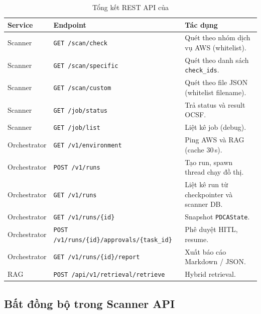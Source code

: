 \begin{table}[!htb]
  \centering
  \caption{Tổng kết REST API của \sysnameshort{}}
  \label{tab:api_summary}
  \renewcommand{\arraystretch}{1.15}
  \begin{tabular}{|l|l|p{6.5cm}|}
    \hline
    \textbf{Service} & \textbf{Endpoint} & \textbf{Tác dụng} \\ \hline
    Scanner          & \texttt{GET /scan/check}        & Quét theo nhóm dịch vụ AWS (whitelist). \\ \hline
    Scanner          & \texttt{GET /scan/specific}     & Quét theo danh sách \texttt{check\_ids}. \\ \hline
    Scanner          & \texttt{GET /scan/custom}       & Quét theo file JSON (whitelist filename). \\ \hline
    Scanner          & \texttt{GET /job/status}        & Trả status và result OCSF. \\ \hline
    Scanner          & \texttt{GET /job/list}          & Liệt kê job (debug). \\ \hline
    Orchestrator     & \texttt{GET /v1/environment}    & Ping AWS và RAG (cache 30\,s). \\ \hline
    Orchestrator     & \texttt{POST /v1/runs}          & Tạo run, spawn thread chạy đồ thị. \\ \hline
    Orchestrator     & \texttt{GET /v1/runs}           & Liệt kê run từ checkpointer và scanner DB. \\ \hline
    Orchestrator     & \texttt{GET /v1/runs/\{id\}}    & Snapshot \texttt{PDCAState}. \\ \hline
    Orchestrator     & \texttt{POST /v1/runs/\{id\}/approvals/\{task\_id\}} & Phê duyệt HITL, resume. \\ \hline
    Orchestrator     & \texttt{GET /v1/runs/\{id\}/report} & Xuất báo cáo Markdown / JSON. \\ \hline
    RAG              & \texttt{POST /api/v1/retrieval/retrieve} & Hybrid retrieval. \\ \hline
  \end{tabular}
\end{table}

\subsection{Bất đồng bộ trong Scanner API}

